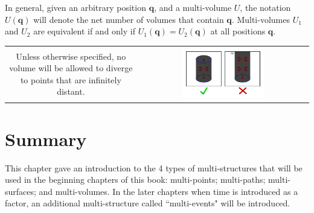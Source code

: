 In general, given an arbitrary position \(\mathbf{q}\), and a multi-volume \(U\), the notation \(U(\mathbf{q})\) will denote the net number of volumes that contain \(\mathbf{q}\). Multi-volumes \(U_1\) and \(U_2\) are equivalent if and only if \(U_1(\mathbf{q}) = U_2(\mathbf{q})\) at all positions \(\mathbf{q}\). 

\begin{center}
\begin{tabular}{cc}
\parbox{0.5\textwidth}{
Unless otherwise specified, no volume will be allowed to diverge to points that are infinitely distant.
} & \parbox{0.5\textwidth}{
\includegraphics[width = 0.5\textwidth]{Multi-structures/Multivolumes/no_infinite_volumes}
}
\end{tabular}
\end{center}



\section{Summary}

This chapter gave an introduction to the 4 types of multi-structures that will be used in the beginning chapters of this book: multi-points; multi-paths; multi-surfaces; and multi-volumes. In the later chapters when time is introduced as a factor, an additional multi-structure called ``multi-events" will be introduced.


